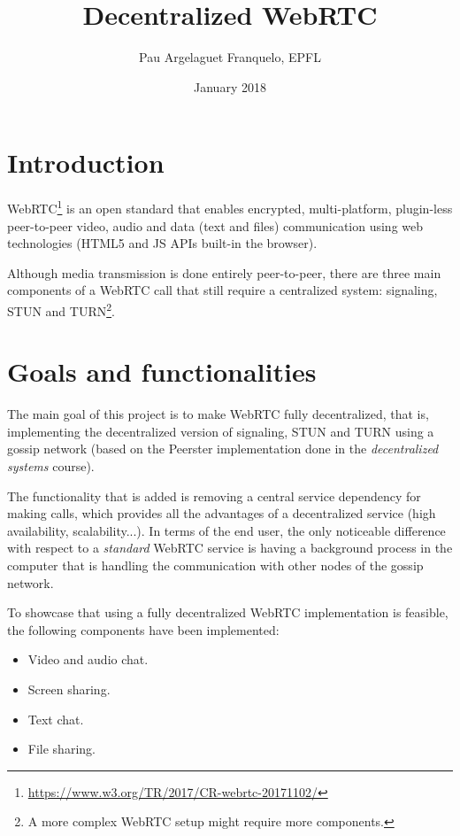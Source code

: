 \documentclass[paper=a4, fontsize=11pt]{scrartcl} %
\title{	
\normalfont
\huge Decentralized WebRTC \\
}
\author{Pau Argelaguet Franquelo, EPFL}
\date{\normalsize January 2018}
\numberwithin{equation}{section} %
\numberwithin{figure}{section} %
\numberwithin{table}{section} %
\begin{document}
\maketitle

\section{Introduction}

WebRTC\footnote{\url{https://www.w3.org/TR/2017/CR-webrtc-20171102/}} is an open standard that enables encrypted, multi-platform, plugin-less peer-to-peer video, audio and data (text and files) communication using web technologies (HTML5 and JS APIs built-in the browser). 

Although media transmission is done entirely peer-to-peer, there are three main components of a WebRTC call that still require a centralized system: signaling, STUN and TURN\footnote{A more complex WebRTC setup might require more components.}.

\section{Goals and functionalities}

The main goal of this project is to make WebRTC fully decentralized, that is, implementing the decentralized version of signaling, STUN and TURN using a gossip network (based on the Peerster implementation done in the \textit{decentralized systems} course). 

The functionality that is added is removing a central service dependency for making calls, which provides all the advantages of a decentralized service (high availability, scalability...). In terms of the end user, the only noticeable difference with respect to a \textit{standard} WebRTC service is having a background process in the computer that is handling the communication with other nodes of the gossip network.

To showcase that using a fully decentralized WebRTC implementation is feasible, the following components have been implemented:

\begin{itemize}
	\item Video and audio chat.
	\item Screen sharing.
	\item Text chat.
	\item File sharing.
\end{itemize}
\end{document}
